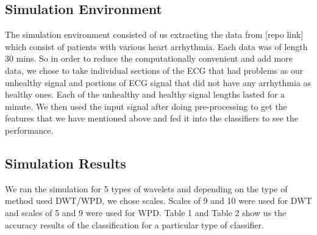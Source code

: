 \documentclass[10pt,twocolumn,letterpaper]{article}
\begin{document}
\subsection{Simulation Environment}
The simulation environment consisted of us extracting the data from [repo link] which consist of patients with various heart arrhythmia. Each data was of length 30 mins. So in order to reduce the computationally convenient and add more data, we chose to take individual sections of the ECG that had problems as our unhealthy signal and portions of ECG signal that did not have any arrhythmia as healthy ones. Each of the unhealthy and healthy signal lengths lasted for a minute. We then used the input signal after doing pre-processing to get the features that we have mentioned above and fed it into the classifiers to see the performance.

\subsection{Simulation Results} 
We ran the simulation for 5 types of wavelets and depending on the type of method used DWT/WPD, we chose scales. Scales of 9 and 10 were used for DWT and scales of 5 and 9 were used for WPD. Table 1 and Table 2 show us the accuracy results of the classification for a particular type of classifier.
\end{document}

